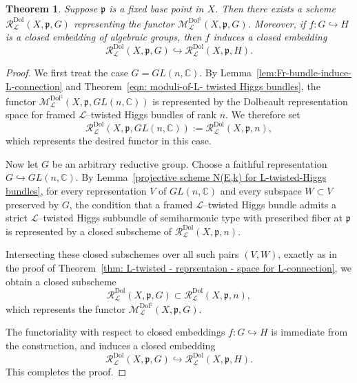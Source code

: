 \documentclass[12pt,reqno]{amsart}
\numberwithin{equation}{subsection}
\newtheorem{thm}[equation]{Theorem}
\theoremstyle{definition}
\theoremstyle{theorem}
\begin{document}
\begin{thm}\label{thm:Dol-L-representation-space}
	Suppose $\mathfrak{p}$ is a fixed base point in $X$. Then there exists a scheme $
	\mathcal{R}^{\mathrm{Dol}}_{\mathcal{L}}(X,\mathfrak{p},G)$
	representing the functor
	$\mathcal{M}^{\mathrm{Dol}^{\natural}}_{\mathcal{L}}(X,\mathfrak{p},G)$.
	Moreover, if $f \colon G \hookrightarrow H$ is a closed embedding of
	algebraic groups, then $f$ induces a closed embedding
	\[
	\mathcal{R}^{\mathrm{Dol}}_{\mathcal{L}}(X,\mathfrak{p},G)
	\hookrightarrow
	\mathcal{R}^{\mathrm{Dol}}_{\mathcal{L}}(X,\mathfrak{p},H).
	\]
\end{thm}

\begin{proof}
	We first treat the case $G = GL(n,\mathbb{C})$. By
	Lemma~\eqref{lem:Fr-bundle-induce-L-connection} and
	Theorem~\eqref{eqn: moduli-of-L- twisted Higgs bundles}, the functor
	$\mathcal{M}^{\mathrm{Dol}^{\natural}}_{\mathcal{L}}(X,\mathfrak{p},GL(n,\mathbb{C}))$
	is represented by the Dolbeault representation space for framed
	$\mathcal{L}$--twisted Higgs bundles of rank $n$. We therefore set
	\[
	\mathcal{R}^{\mathrm{Dol}}_{\mathcal{L}}(X,\mathfrak{p},GL(n,\mathbb{C}))
	:= \mathcal{R}^{\mathrm{Dol}}_{\mathcal{L}}(X,\mathfrak{p},n),
	\]
	which represents the desired functor in this case.
	
	Now let $G$ be an arbitrary reductive group. Choose a faithful
	representation $G \hookrightarrow GL(n,\mathbb{C})$. By
	Lemma~\eqref{projective scheme N(E,k) for L-twisted-Higgs bundles}, for every representation $V$ of $GL(n,\mathbb{C})$ and every subspace $W \subset V$ preserved by $G$, the condition that a framed
	$\mathcal{L}$--twisted Higgs bundle admits a strict
	$\mathcal{L}$--twisted Higgs subbundle of semiharmonic type with prescribed fiber at $\mathfrak{p}$ is represented by a closed subscheme of $\mathcal{R}^{\mathrm{Dol}}_{\mathcal{L}}(X,\mathfrak{p},n)$.
	
	Intersecting these closed subschemes over all such pairs $(V,W)$, exactly as in the proof of
	Theorem~\eqref{thm: L-twisted - reprsentaion - space for L-connection}, we obtain a closed subscheme
	\[
	\mathcal{R}^{\mathrm{Dol}}_{\mathcal{L}}(X,\mathfrak{p},G)
	\subset
	\mathcal{R}^{\mathrm{Dol}}_{\mathcal{L}}(X,\mathfrak{p},n),
	\]
	which represents the functor
	$\mathcal{M}^{\mathrm{Dol}^{\natural}}_{\mathcal{L}}(X,\mathfrak{p},G)$.
	
	The functoriality with respect to closed embeddings
	$f \colon G \hookrightarrow H$ is immediate from the construction, and
	induces a closed embedding
	\[
	\mathcal{R}^{\mathrm{Dol}}_{\mathcal{L}}(X,\mathfrak{p},G)
	\hookrightarrow
	\mathcal{R}^{\mathrm{Dol}}_{\mathcal{L}}(X,\mathfrak{p},H).
	\]
	This completes the proof.
\end{proof}
\end{document}
